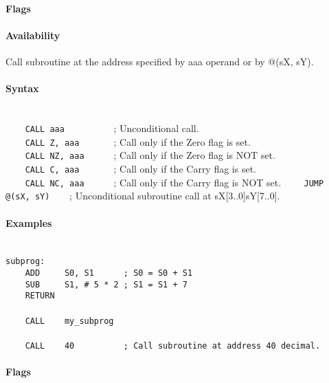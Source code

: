         \paragraph{Flags}

        \paragraph{Availability}
            \pbavailability{\yes}{\yes}{\yes}{\yes}{\yes}

    \clearpage
        Call subroutine at the address specified by aaa operand or by @(sX, sY).

        \paragraph{Syntax}
            ~\\
            \verb'    CALL aaa          '; Unconditional call.\\
            \verb'    CALL Z, aaa       '; Call only if the Zero flag is set.\\
            \verb'    CALL NZ, aaa      '; Call only if the Zero flag is NOT set.\\
            \verb'    CALL C, aaa       '; Call only if the Carry flag is set.\\
            \verb'    CALL NC, aaa      '; Call only if the Carry flag is NOT set.
            \verb'    JUMP @(sX, sY)    '; Unconditional subroutine call at sX[3..0]sY[7..0].

        \paragraph{Examples}
            ~\\
            \verb'subprog:'\\
            \verb'    ADD     S0, S1      ; S0 = S0 + S1'\\
            \verb'    SUB     S1, # 5 * 2 ; S1 = S1 + 7'\\
            \verb'    RETURN'\\
            \verb''\\
            \verb'    CALL    my_subprog'\\
            \verb''\\
            \verb'    CALL    40          ; Call subroutine at address 40 decimal.'

        \paragraph{Flags}

